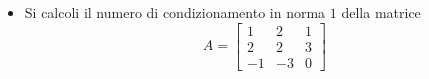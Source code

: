 \begin{itemize}
\item Si calcoli il numero di condizionamento in norma $1$ della matrice
\bigskip
\[
A=\left[
\begin{array}{ccc}
1 & 2 & 1 \\
2 & 2 & 3\\
-1 & -3 & 0
\end{array}\right]
\]
\end{itemize}
